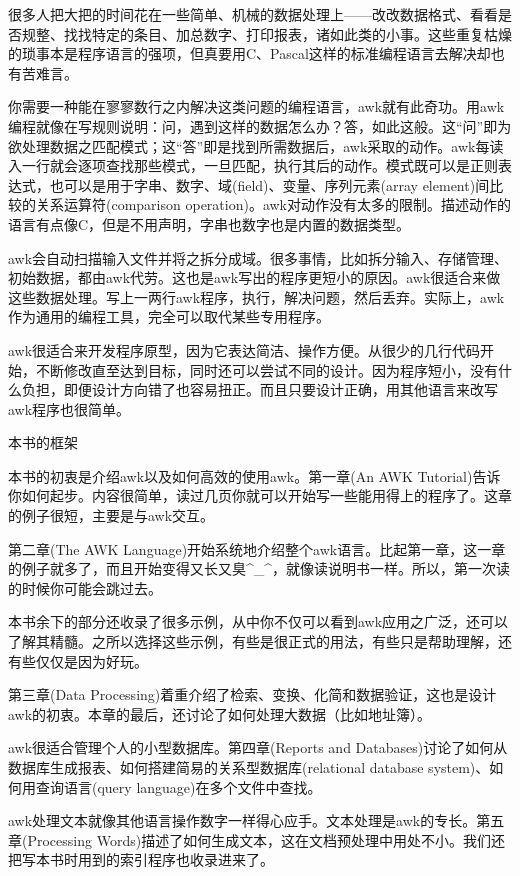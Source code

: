 很多人把大把的时间花在一些简单、机械的数据处理上——改改数据格式、看看是否规整、找找特定的条目、加总数字、打印报表，诸如此类的小事。这些重复枯燥的琐事本是程序语言的强项，但真要用C、Pascal这样的标准编程语言去解决却也有苦难言。

你需要一种能在寥寥数行之内解决这类问题的编程语言，awk就有此奇功。用awk编程就像在写规则说明：问，遇到这样的数据怎么办？答，如此这般。这“问”即为欲处理数据之匹配模式；这“答”即是找到所需数据后，awk采取的动作。awk每读入一行就会逐项查找那些模式，一旦匹配，执行其后的动作。模式既可以是正则表达式，也可以是用于字串、数字、域(field)、变量、序列元素(array element)间比较的关系运算符(comparison operation)。awk对动作没有太多的限制。描述动作的语言有点像C，但是不用声明，字串也数字也是内置的数据类型。

awk会自动扫描输入文件并将之拆分成域。很多事情，比如拆分输入、存储管理、初始数据，都由awk代劳。这也是awk写出的程序更短小的原因。awk很适合来做这些数据处理。写上一两行awk程序，执行，解决问题，然后丢弃。实际上，awk作为通用的编程工具，完全可以取代某些专用程序。

awk很适合来开发程序原型，因为它表达简洁、操作方便。从很少的几行代码开始，不断修改直至达到目标，同时还可以尝试不同的设计。因为程序短小，没有什么负担，即便设计方向错了也容易扭正。而且只要设计正确，用其他语言来改写awk程序也很简单。

本书的框架

本书的初衷是介绍awk以及如何高效的使用awk。第一章(An AWK Tutorial)告诉你如何起步。内容很简单，读过几页你就可以开始写一些能用得上的程序了。这章的例子很短，主要是与awk交互。

第二章(The AWK Language)开始系统地介绍整个awk语言。比起第一章，这一章的例子就多了，而且开始变得又长又臭^_^，就像读说明书一样。所以，第一次读的时候你可能会跳过去。

本书余下的部分还收录了很多示例，从中你不仅可以看到awk应用之广泛，还可以了解其精髓。之所以选择这些示例，有些是很正式的用法，有些只是帮助理解，还有些仅仅是因为好玩。

第三章(Data Processing)着重介绍了检索、变换、化简和数据验证，这也是设计awk的初衷。本章的最后，还讨论了如何处理大数据（比如地址簿）。

awk很适合管理个人的小型数据库。第四章(Reports and Databases)讨论了如何从数据库生成报表、如何搭建简易的关系型数据库(relational database system)、如何用查询语言(query language)在多个文件中查找。

awk处理文本就像其他语言操作数字一样得心应手。文本处理是awk的专长。第五章(Processing Words)描述了如何生成文本，这在文档预处理中用处不小。我们还把写本书时用到的索引程序也收录进来了。

